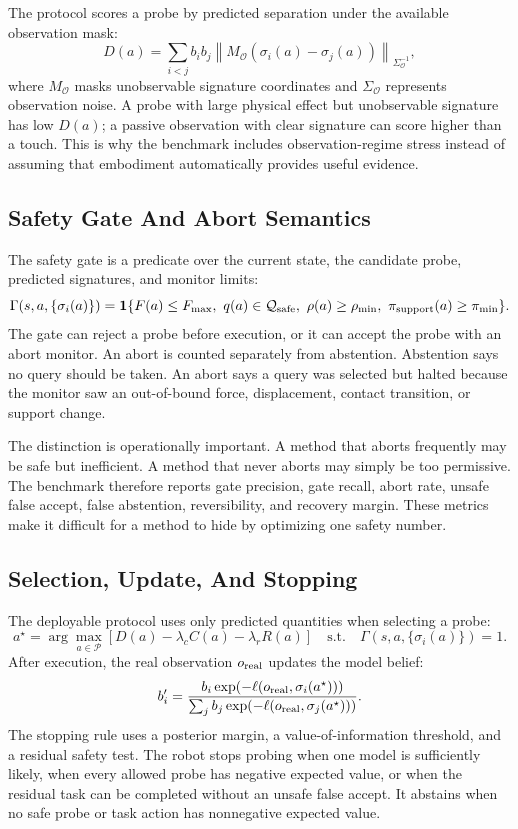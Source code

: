 \documentclass{article}
\newcommand{\obs}{\mathcal{O}}
\begin{document}
The protocol scores a probe by predicted separation under the available observation mask:
\[
    D(a) =
    \sum_{i < j} b_i b_j
    \left\|
    M_{\obs}(\sigma_i(a)-\sigma_j(a))
    \right\|_{\Sigma_{\obs}^{-1}},
\]
where $M_{\obs}$ masks unobservable signature coordinates and $\Sigma_{\obs}$ represents observation noise. A probe with large physical effect but unobservable signature has low $D(a)$; a passive observation with clear signature can score higher than a touch. This is why the benchmark includes observation-regime stress instead of assuming that embodiment automatically provides useful evidence.

\subsection{Safety Gate And Abort Semantics}

The safety gate is a predicate over the current state, the candidate probe, predicted signatures, and monitor limits:
\[
    \Gamma(s,a,\{\sigma_i(a)\}) =
    \mathbf{1}\{F(a) \leq F_{\max},\ q(a) \in \mathcal{Q}_{\rm safe},\
    \rho(a) \geq \rho_{\min},\ \pi_{\rm support}(a) \geq \pi_{\min}\}.
\]
The gate can reject a probe before execution, or it can accept the probe with an abort monitor. An abort is counted separately from abstention. Abstention says no query should be taken. An abort says a query was selected but halted because the monitor saw an out-of-bound force, displacement, contact transition, or support change.

The distinction is operationally important. A method that aborts frequently may be safe but inefficient. A method that never aborts may simply be too permissive. The benchmark therefore reports gate precision, gate recall, abort rate, unsafe false accept, false abstention, reversibility, and recovery margin. These metrics make it difficult for a method to hide by optimizing one safety number.

\subsection{Selection, Update, And Stopping}

The deployable protocol uses only predicted quantities when selecting a probe:
\[
    a^\star =
    \arg\max_{a \in \mathcal{P}}
    \left[
    D(a) - \lambda_c C(a) - \lambda_r R(a)
    \right]
    \quad \text{s.t.} \quad
    \Gamma(s,a,\{\sigma_i(a)\}) = 1.
\]
After execution, the real observation $o_{\rm real}$ updates the model belief:
\[
    b_i' =
    \frac{
    b_i \exp(-\ell(o_{\rm real},\sigma_i(a^\star)))
    }{
    \sum_j b_j \exp(-\ell(o_{\rm real},\sigma_j(a^\star)))
    }.
\]
The stopping rule uses a posterior margin, a value-of-information threshold, and a residual safety test. The robot stops probing when one model is sufficiently likely, when every allowed probe has negative expected value, or when the residual task can be completed without an unsafe false accept. It abstains when no safe probe or task action has nonnegative expected value.
\end{document}

